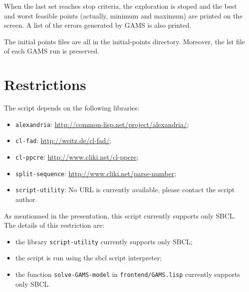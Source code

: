 \documentclass{article}
\begin{document}
When the last set reaches stop criteria, the exploration is stoped and the best
and worst feasible points (actually, minimum and maximum) are printed on the
screen. A list of the errors generated by GAMS is also printed.

The initial points files are all in the initial-points directory. Moreover, the
lst file of each GAMS run is preserved.

\section*{Restrictions}

The script depends on the following libraries:
\begin{itemize}
\item \texttt{alexandria}: \url{http://common-lisp.net/project/alexandria/};
\item \texttt{cl-fad}: \url{http://weitz.de/cl-fad/};
\item \texttt{cl-ppcre}: \url{http://www.cliki.net/cl-ppcre};
\item \texttt{split-sequence}: \url{http://www.cliki.net/parse-number};
\item \texttt{script-utility}: No URL is currently available, please contact the
  script author.
\end{itemize}

As mentionned in the presentation, this script currently supports only SBCL.
The details of this restriction are:
\begin{itemize}
\item the library \texttt{script-utility} currently supports only SBCL;
\item the script is run using the sbcl script interpreter;
\item the function \texttt{solve-GAMS-model} in \texttt{frontend/GAMS.lisp}
  currently supports only SBCL.
\end{itemize}
\end{document}
